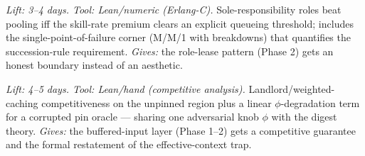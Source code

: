 \documentclass[11pt,a4paper]{article}
\begin{document}
\begin{description}[leftmargin=0em,style=unboxed]
\item[B8. The specialization boundary.] \emph{Lift: 3--4 days. Tool: Lean/numeric (Erlang-C).} Sole-responsibility roles beat pooling iff the skill-rate premium clears an explicit queueing threshold; includes the single-point-of-failure corner (M/M/1 with breakdowns) that quantifies the succession-rule requirement. \emph{Gives:} the role-lease pattern (Phase 2) gets an honest boundary instead of an aesthetic.

\item[B9. Context paging with an untrusted pin oracle.] \emph{Lift: 4--5 days. Tool: Lean/hand (competitive analysis).} Landlord/weighted-caching competitiveness on the unpinned region plus a linear $\phi$-degradation term for a corrupted pin oracle --- sharing one adversarial knob $\phi$ with the digest theory. \emph{Gives:} the buffered-input layer (Phase 1--2) gets a competitive guarantee and the formal restatement of the effective-context trap.
\end{description}
\end{document}
